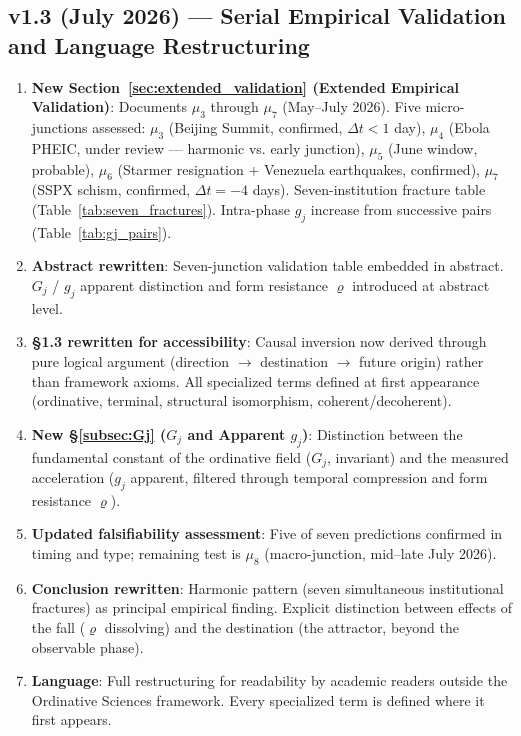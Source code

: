 \documentclass[12pt,a4paper]{article}
\newcommand{\gj}{g_j}
\begin{document}
\subsection*{v1.3 (July 2026) --- Serial Empirical Validation and Language Restructuring}

\begin{enumerate}[label=\textbf{\arabic*.}]
    \item \textbf{New Section~\ref{sec:extended_validation} (Extended Empirical Validation)}: Documents $\mu_3$ through $\mu_7$ (May--July 2026). Five micro-junctions assessed: $\mu_3$ (Beijing Summit, confirmed, $\Delta t < 1$ day), $\mu_4$ (Ebola PHEIC, under review --- harmonic vs. early junction), $\mu_5$ (June window, probable), $\mu_6$ (Starmer resignation + Venezuela earthquakes, confirmed), $\mu_7$ (SSPX schism, confirmed, $\Delta t = -4$ days). Seven-institution fracture table (Table~\ref{tab:seven_fractures}). Intra-phase $\gj$ increase from successive pairs (Table~\ref{tab:gj_pairs}).
    \item \textbf{Abstract rewritten}: Seven-junction validation table embedded in abstract. $G_j$ / $\gj$ apparent distinction and form resistance $\varrho$ introduced at abstract level.
    \item \textbf{§1.3 rewritten for accessibility}: Causal inversion now derived through pure logical argument (direction $\to$ destination $\to$ future origin) rather than framework axioms. All specialized terms defined at first appearance (ordinative, terminal, structural isomorphism, coherent/decoherent).
    \item \textbf{New §\ref{subsec:Gj} ($G_j$ and Apparent $\gj$)}: Distinction between the fundamental constant of the ordinative field ($G_j$, invariant) and the measured acceleration ($\gj$ apparent, filtered through temporal compression and form resistance $\varrho$).
    \item \textbf{Updated falsifiability assessment}: Five of seven predictions confirmed in timing and type; remaining test is $\mu_8$ (macro-junction, mid--late July 2026).
    \item \textbf{Conclusion rewritten}: Harmonic pattern (seven simultaneous institutional fractures) as principal empirical finding. Explicit distinction between effects of the fall ($\varrho$ dissolving) and the destination (the attractor, beyond the observable phase).
    \item \textbf{Language}: Full restructuring for readability by academic readers outside the Ordinative Sciences framework. Every specialized term is defined where it first appears.
\end{enumerate}
\end{document}

